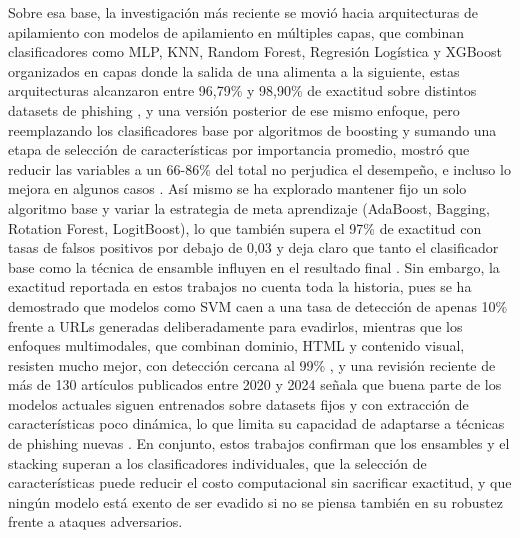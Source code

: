 Sobre esa base, la investigación más reciente se movió hacia arquitecturas de apilamiento con modelos de apilamiento en múltiples capas, que combinan clasificadores como MLP, KNN, Random Forest, Regresión Logística y XGBoost organizados en capas donde la salida de una alimenta a la siguiente, estas arquitecturas alcanzaron entre 96,79\% y 98,90\% de exactitud sobre distintos datasets de phishing \cite{kalabarige2022multilayer}, y una versión posterior de ese mismo enfoque, pero reemplazando los clasificadores base por algoritmos de boosting y sumando una etapa de selección de características por importancia promedio, mostró que reducir las variables a un 66-86\% del total no perjudica el desempeño, e incluso lo mejora en algunos casos \cite{kalabarige2023boosting}. Así mismo se ha explorado mantener fijo un solo algoritmo base y variar la estrategia de meta aprendizaje (AdaBoost, Bagging, Rotation Forest, LogitBoost), lo que también supera el 97\% de exactitud con tasas de falsos positivos por debajo de 0,03 y deja claro que tanto el clasificador base como la técnica de ensamble influyen en el resultado final \cite{alsariera2020ai}. Sin embargo, la exactitud reportada en estos trabajos no cuenta toda la historia, pues se ha demostrado que modelos como SVM caen a una tasa de detección de apenas 10\% frente a URLs generadas deliberadamente para evadirlos, mientras que los enfoques multimodales, que combinan dominio, HTML y contenido visual, resisten mucho mejor, con detección cercana al 99\% \cite{duy2024study}, y una revisión reciente de más de 130 artículos publicados entre 2020 y 2024 señala que buena parte de los modelos actuales siguen entrenados sobre datasets fijos y con extracción de características poco dinámica, lo que limita su capacidad de adaptarse a técnicas de phishing nuevas \cite{ahmad2025across}. En conjunto, estos trabajos confirman que los ensambles y el stacking superan a los clasificadores individuales, que la selección de características puede reducir el costo computacional sin sacrificar exactitud, y que ningún modelo está exento de ser evadido si no se piensa también en su robustez frente a ataques adversarios.